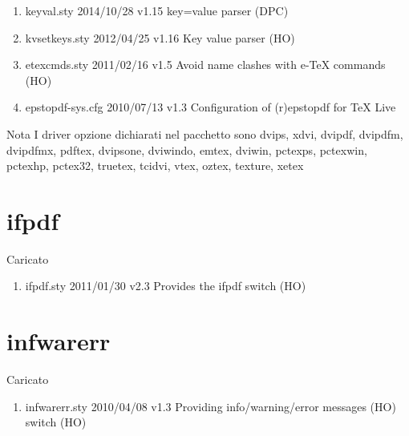 \begin{enumerate}
\item keyval.sty 2014/10/28 v1.15 key=value parser (DPC)
\item kvsetkeys.sty 2012/04/25 v1.16 Key value parser (HO)
\item etexcmds.sty 2011/02/16 v1.5 Avoid name clashes with e-TeX commands (HO)
\item epstopdf-sys.cfg 2010/07/13 v1.3 Configuration of (r)epstopdf for TeX Live	
\end{enumerate}	
Nota I driver opzione dichiarati nel pacchetto sono dvips, xdvi, dvipdf, dvipdfm, dvipdfmx, pdftex, dvipsone, dviwindo, emtex, dviwin, pctexps, pctexwin, pctexhp, pctex32, truetex, tcidvi, vtex, oztex, texture, xetex
\section{ifpdf}		 

Caricato 
\begin{enumerate}
\item ifpdf.sty 2011/01/30 v2.3 Provides the ifpdf switch (HO)
\end{enumerate}	
\section{infwarerr}		 

Caricato 
\begin{enumerate}
\item infwarerr.sty 2010/04/08 v1.3 Providing info/warning/error messages (HO) switch (HO)
\end{enumerate}	
